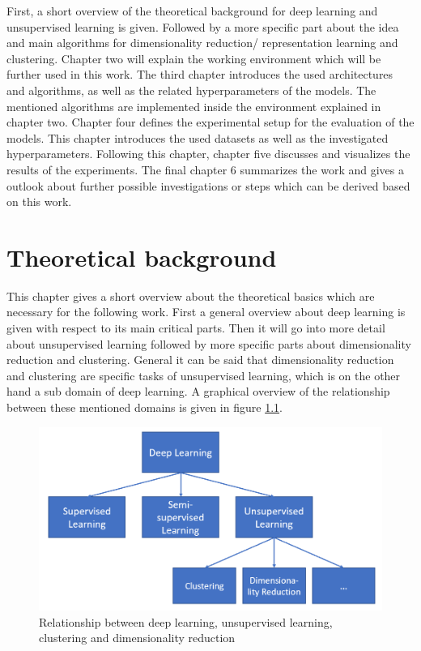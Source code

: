 \documentclass[12pt,DIV14,BCOR12mm,a4paper,footexclude,headinclude,halfparskip-,twoside,openright,openany,cleardoubleempty,idxtotoc,bibtotoc]{scrreprt} %
\numberwithin{equation}{chapter}
\begin{document}
First, a short overview of the theoretical background for deep learning and unsupervised learning is given. Followed by a more specific part about the idea and main algorithms for dimensionality reduction/ representation learning and clustering. Chapter two will explain the working environment which will be further used in this work. The third chapter introduces the used architectures and algorithms, as well as the related hyperparameters of the models. The mentioned algorithms are implemented inside the environment explained in chapter two. Chapter four defines the experimental setup for the evaluation of the models. This chapter introduces the used datasets as well as the investigated hyperparameters. Following this chapter, chapter five discusses and visualizes the results of the experiments. The final chapter 6 summarizes the work and gives a outlook about further possible investigations or steps which can be derived based on this work.

\chapter{Theoretical background}
This chapter gives a short overview about the theoretical basics which are necessary for the following work. First a general overview about deep learning is given with respect to its main critical parts. Then it will go into more detail about unsupervised learning followed by more specific parts about dimensionality reduction and clustering. General it can be said that dimensionality reduction and clustering are specific tasks of unsupervised learning, which is on the other hand a sub domain of deep learning. A graphical overview of the relationship between these mentioned domains is given in figure \ref{fig:Relationship_DL}. 
\begin{figure}[htb!]
	\centering
	\includegraphics[width=0.5\linewidth]{Graphiken/Overview_Deep_Learning}
	\caption{Relationship between deep learning, unsupervised learning, clustering and dimensionality reduction}
	\label{fig:Relationship_DL}
\end{figure}
\end{document}
